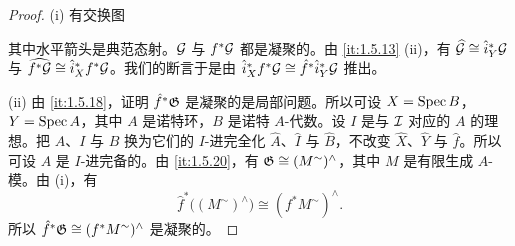 \begin{proof}
(i) 有交换图
\begin{center}
\end{center}
其中水平箭头是典范态射。$\mathcal{G}$ 与 $f^*\mathcal{G}$ 都是凝聚的。由 \ref{it:1.5.13} (ii)，有 $\widehat{\mathcal{G}}\cong\hat i_Y^*\mathcal{G}$ 与 $\widehat{f^*\mathcal{G}}\cong\hat i_X^*f^*\mathcal{G}$。我们的断言于是由 $\hat i_X^*f^*\mathcal{G}\cong\hat f^*\hat i_Y^*\mathcal{G}$ 推出。

(ii) 由 \ref{it:1.5.18}，证明 $\hat f^*\mathfrak{G}$ 是凝聚的是局部问题。所以可设 $X=\operatorname{Spec} B$，$Y=\operatorname{Spec} A$，其中 $A$ 是诺特环，$B$ 是诺特 $A$-代数。设 $I$ 是与 $\mathcal{I}$ 对应的 $A$ 的理想。把 $A$、$I$ 与 $B$ 换为它们的 $I$-进完全化 $\widehat A$、$\widehat I$ 与 $\widehat B$，不改变 $\widehat X$、$\widehat Y$ 与 $\hat f$。所以可设 $A$ 是 $I$-进完备的。由 \ref{it:1.5.20}，有 $\mathfrak{G}\cong(M^{\sim})^{\wedge}$，其中 $M$ 是有限生成 $A$-模。由 (i)，有
\[
\hat f^*\bigl((M^{\sim})^{\wedge}\bigr)\cong(f^*M^{\sim})^{\wedge}.
\]
所以 $\hat f^*\mathfrak{G}\cong(f^*M^{\sim})^{\wedge}$ 是凝聚的。
\end{proof}

